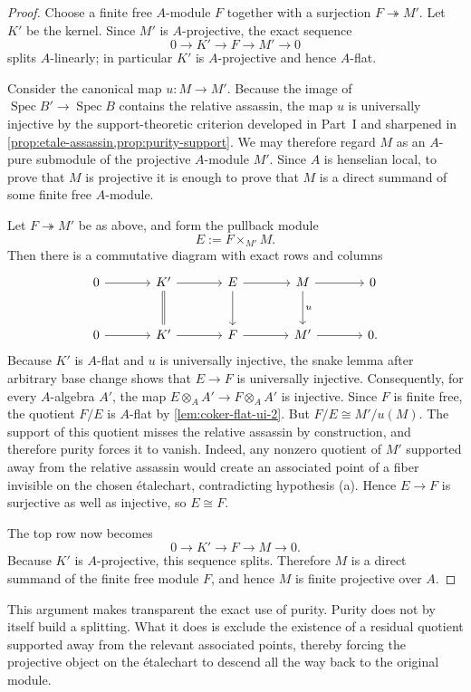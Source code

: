 \documentclass[11pt,oneside]{article}
\newcommand{\Spec}{\operatorname{Spec}}
\newcommand{\ot}{\otimes}
\newcommand{\etale}{\'etale}
\begin{document}
\begin{proof}
Choose a finite free $A$-module $F$ together with a surjection $F\twoheadrightarrow M'$.  Let $K'$ be the kernel.  Since $M'$ is $A$-projective, the exact sequence
\[
0\to K'\to F\to M'\to 0
\]
splits $A$-linearly; in particular $K'$ is $A$-projective and hence $A$-flat.

Consider the canonical map $u\colon M\to M'$.  Because the image of $\Spec B'\to\Spec B$ contains the relative assassin, the map $u$ is universally injective by the support-theoretic criterion developed in Part~I and sharpened in \cref{prop:etale-assassin,prop:purity-support}.  We may therefore regard $M$ as an $A$-pure submodule of the projective $A$-module $M'$.  Since $A$ is henselian local, to prove that $M$ is projective it is enough to prove that $M$ is a direct summand of some finite free $A$-module.

Let $F\twoheadrightarrow M'$ be as above, and form the pullback module
\[
E:=F\times_{M'} M.
\]
Then there is a commutative diagram with exact rows and columns
\[
\begin{tikzcd}[column sep=large,row sep=large]
0 \ar[r] & K' \ar[r] \ar[d,equal] & E \ar[r] \ar[d] & M \ar[r] \ar[d,"u"] & 0 \\
0 \ar[r] & K' \ar[r] & F \ar[r] & M' \ar[r] & 0.
\end{tikzcd}
\]
Because $K'$ is $A$-flat and $u$ is universally injective, the snake lemma after arbitrary base change shows that $E\to F$ is universally injective.  Consequently, for every $A$-algebra $A'$, the map $E\ot_A A'\to F\ot_A A'$ is injective.  Since $F$ is finite free, the quotient $F/E$ is $A$-flat by \cref{lem:coker-flat-ui-2}.  But $F/E\cong M'/u(M)$.  The support of this quotient misses the relative assassin by construction, and therefore purity forces it to vanish.  Indeed, any nonzero quotient of $M'$ supported away from the relative assassin would create an associated point of a fiber invisible on the chosen \etale chart, contradicting hypothesis (a).  Hence $E\to F$ is surjective as well as injective, so $E\cong F$.

The top row now becomes
\[
0\to K'\to F\to M\to 0.
\]
Because $K'$ is $A$-projective, this sequence splits.  Therefore $M$ is a direct summand of the finite free module $F$, and hence $M$ is finite projective over $A$.
\end{proof}

This argument makes transparent the exact use of purity.  Purity does not by itself build a splitting.  What it does is exclude the existence of a residual quotient supported away from the relevant associated points, thereby forcing the projective object on the \etale chart to descend all the way back to the original module.
\end{document}
